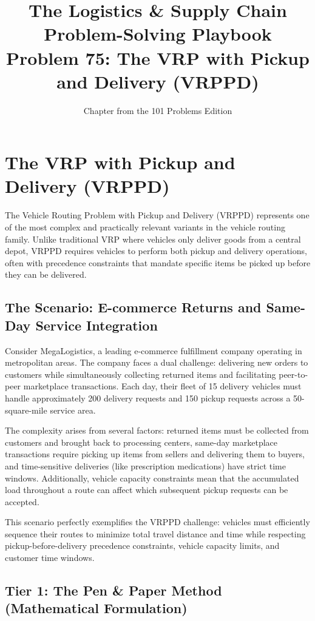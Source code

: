 \documentclass{article}
\title{The Logistics \& Supply Chain Problem-Solving Playbook\\Problem 75: The VRP with Pickup and Delivery (VRPPD)}
\author{Chapter from the 101 Problems Edition}
\date{}
\begin{document}
\maketitle

\section{The VRP with Pickup and Delivery (VRPPD)}

The Vehicle Routing Problem with Pickup and Delivery (VRPPD) represents one of the most complex and practically relevant variants in the vehicle routing family. Unlike traditional VRP where vehicles only deliver goods from a central depot, VRPPD requires vehicles to perform both pickup and delivery operations, often with precedence constraints that mandate specific items be picked up before they can be delivered.

\subsection{The Scenario: E-commerce Returns and Same-Day Service Integration}

Consider MegaLogistics, a leading e-commerce fulfillment company operating in metropolitan areas. The company faces a dual challenge: delivering new orders to customers while simultaneously collecting returned items and facilitating peer-to-peer marketplace transactions. Each day, their fleet of 15 delivery vehicles must handle approximately 200 delivery requests and 150 pickup requests across a 50-square-mile service area.

The complexity arises from several factors: returned items must be collected from customers and brought back to processing centers, same-day marketplace transactions require picking up items from sellers and delivering them to buyers, and time-sensitive deliveries (like prescription medications) have strict time windows. Additionally, vehicle capacity constraints mean that the accumulated load throughout a route can affect which subsequent pickup requests can be accepted.

This scenario perfectly exemplifies the VRPPD challenge: vehicles must efficiently sequence their routes to minimize total travel distance and time while respecting pickup-before-delivery precedence constraints, vehicle capacity limits, and customer time windows.

\subsection{Tier 1: The Pen \& Paper Method (Mathematical Formulation)}
\end{document}
